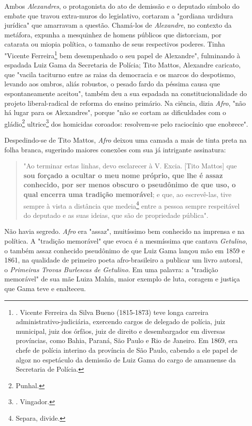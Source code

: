 Ambos \emph{Alexandres}, o protagonista do ato de demissão e o deputado
símbolo do embate que travou extra-muros do legislativo, cortaram a
"gordiana urdidura jurídica" que amarravam a questão. Chamá-los de
\emph{Alexandre}, no contexto da metáfora, expunha a mesquinhez de
homens públicos que distorciam, por catarata ou miopia política, o
tamanho de seus respectivos poderes. Tinha "Vicente Ferreira\footnote{.
  Vicente Ferreira da Silva Bueno (1815-1873) teve longa carreira
  administrativo-judiciária, exercendo cargos de delegado de polícia,
  juiz municipal, juiz dos órfãos, juiz de direito e desembargador em
  diversas províncias, como Bahia, Paraná, São Paulo e Rio de Janeiro.
  Em 1869, era chefe de polícia interino da província de São Paulo,
  cabendo a ele papel de algoz no espetáculo da demissão de Luiz Gama do
  cargo de amanuense da Secretaria de Polícia.} bem desempenhado o seu
papel de Alexandre", fulminando à espadada Luiz Gama da Secretaria de
Polícia; Tito Mattos, Alexandre caricato, que "vacila taciturno entre as
raias da democracia e os marcos do despotismo, levando aos ombros, aliás
robustos, o pesado fardo da péssima causa que espontaneamente aceitou",
também deu a sua espadada na constitucionalidade do projeto
liberal-radical de reforma do ensino primário. Na ciência, dizia
\emph{Afro}, "não há lugar para os Alexandres", porque "não se cortam as
dificuldades com o gládio\footnote{Punhal.} ultrice\footnote{.
  Vingador.} dos homicidas coroados: resolvem-se pelo raciocínio que
enobrece".

Despedindo-se de Tito Mattos, \emph{Afro} deixou uma camada a mais de
tinta preta na folha branca, sugerindo maiores conexões com sua já
intrigante assinatura:

\begin{quote}
"Ao terminar estas linhas, devo esclarecer à V. Excia. {[}Tito Mattos{]}
que \textbf{sou forçado a ocultar o meu nome próprio, que lhe é assaz
conhecido, por ser menos obscuro o pseudônimo de que uso, o qual encerra
uma tradição memorável}; e que, ao escrevê-las, tive sempre à vista a
distância que medeia\footnote{Separa, divide.} entre a pessoa sempre
respeitável do deputado e as suas ideias, que são de propriedade
pública".
\end{quote}

Não havia segredo. \emph{Afro} era "assaz", muitíssimo bem conhecido na
imprensa e na política. A "tradição memorável" que evoca é a mesmíssima
que cantava \emph{Getulino}, o também assaz conhecido pseudônimo de que
Luiz Gama lançou mão em 1859 e 1861, na qualidade de primeiro poeta
afro-brasileiro a publicar um livro autoral, o \emph{Primeiras Trovas
Burlescas de Getulino}. Em uma palavra: a "tradição memorável" de sua
mãe Luiza Mahín, maior exemplo de luta, coragem e justiça que Gama teve
e enalteceu.

